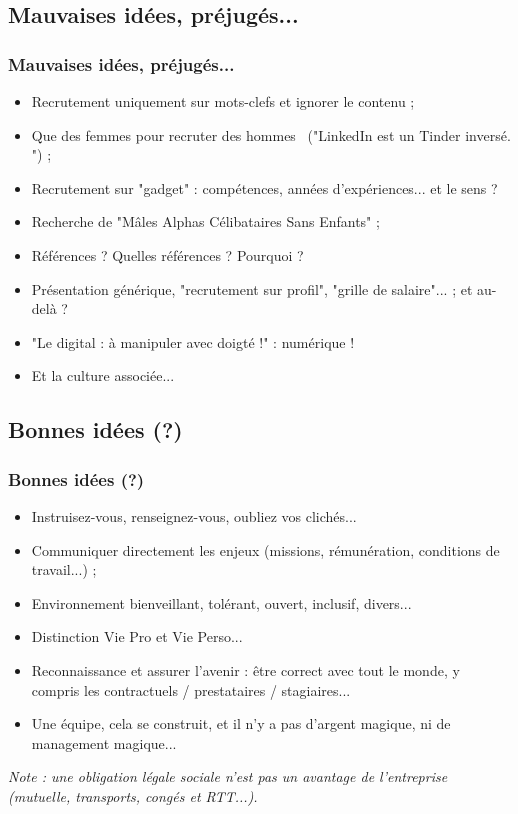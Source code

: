 \documentclass[slidetop,11pt]{beamer}
\begin{document}
\subsection{Mauvaises id{\'e}es, pr{\'e}jug{\'e}s...}
\begin{frame}
	\frametitle{Mauvaises id{\'e}es, pr{\'e}jug{\'e}s...}
	\begin{itemize}
		\item Recrutement uniquement sur mots-clefs et ignorer le contenu ; 
		\item Que des femmes pour recruter des hommes~\newline
		("LinkedIn est un Tinder invers{\'e}. ") ; 
		\item Recrutement sur "gadget" : comp{\'e}tences, ann{\'e}es d'exp{\'e}riences... et le sens ?
		\item Recherche de "M{\^a}les Alphas C{\'e}libataires Sans Enfants" ; 
		\item R{\'e}f{\'e}rences ? Quelles r{\'e}f{\'e}rences ? Pourquoi ?
		\item Pr{\'e}sentation g{\'e}n{\'e}rique, "recrutement sur profil", "grille de salaire"... ; et au-del{\`a} ? 
		\item "Le digital : {\`a} manipuler avec doigt{\'e} !" : num{\'e}rique !
		\item Et la culture associ{\'e}e... 
	\end{itemize}
\end{frame}

\subsection{Bonnes id{\'e}es (?)}
\begin{frame}
	\frametitle{Bonnes id{\'e}es (?)}
	\begin{itemize}
		\item Instruisez-vous, renseignez-vous, oubliez vos clich{\'e}s...
		\item Communiquer directement les enjeux (missions, r{\'e}mun{\'e}ration, conditions de travail...) ;
		\item Environnement bienveillant, tol{\'e}rant, ouvert, inclusif, divers...
		\item Distinction Vie Pro et Vie Perso...
		\item Reconnaissance et assurer l'avenir : {\^e}tre correct avec tout le monde, y compris les contractuels / prestataires / stagiaires...
		\item Une {\'e}quipe, cela se construit, et il n'y a pas d'argent magique, ni de management magique...
	\end{itemize}
	
	\emph{Note : une obligation l{\'e}gale sociale n'est pas un avantage de l'entreprise (mutuelle, transports, cong{\'e}s et RTT...). } 
\end{frame}
\end{document}
